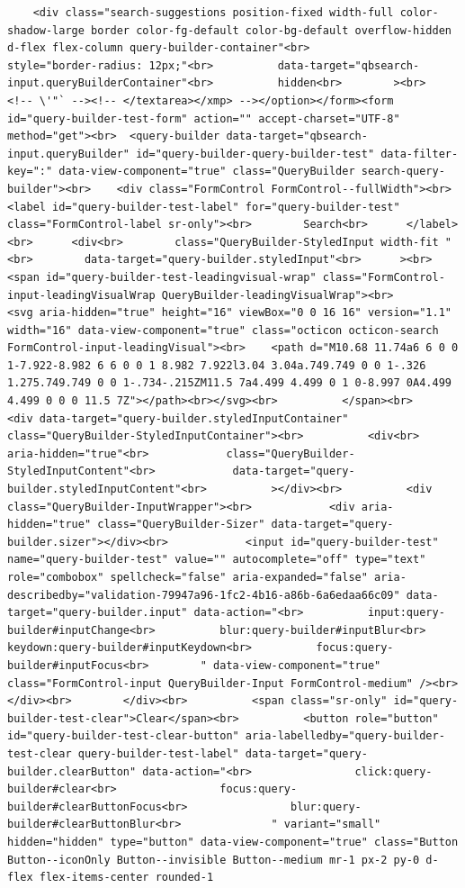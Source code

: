 \documentclass[
  letterpaper,
]{book}
\begin{document}
\begin{verbatim}
    <div class="search-suggestions position-fixed width-full color-shadow-large border color-fg-default color-bg-default overflow-hidden d-flex flex-column query-builder-container"<br>          style="border-radius: 12px;"<br>          data-target="qbsearch-input.queryBuilderContainer"<br>          hidden<br>        ><br>          <!-- \'"` --><!-- </textarea></xmp> --></option></form><form id="query-builder-test-form" action="" accept-charset="UTF-8" method="get"><br>  <query-builder data-target="qbsearch-input.queryBuilder" id="query-builder-query-builder-test" data-filter-key=":" data-view-component="true" class="QueryBuilder search-query-builder"><br>    <div class="FormControl FormControl--fullWidth"><br>      <label id="query-builder-test-label" for="query-builder-test" class="FormControl-label sr-only"><br>        Search<br>      </label><br>      <div<br>        class="QueryBuilder-StyledInput width-fit "<br>        data-target="query-builder.styledInput"<br>      ><br>          <span id="query-builder-test-leadingvisual-wrap" class="FormControl-input-leadingVisualWrap QueryBuilder-leadingVisualWrap"><br>            <svg aria-hidden="true" height="16" viewBox="0 0 16 16" version="1.1" width="16" data-view-component="true" class="octicon octicon-search FormControl-input-leadingVisual"><br>    <path d="M10.68 11.74a6 6 0 0 1-7.922-8.982 6 6 0 0 1 8.982 7.922l3.04 3.04a.749.749 0 0 1-.326 1.275.749.749 0 0 1-.734-.215ZM11.5 7a4.499 4.499 0 1 0-8.997 0A4.499 4.499 0 0 0 11.5 7Z"></path><br></svg><br>          </span><br>        <div data-target="query-builder.styledInputContainer" class="QueryBuilder-StyledInputContainer"><br>          <div<br>            aria-hidden="true"<br>            class="QueryBuilder-StyledInputContent"<br>            data-target="query-builder.styledInputContent"<br>          ></div><br>          <div class="QueryBuilder-InputWrapper"><br>            <div aria-hidden="true" class="QueryBuilder-Sizer" data-target="query-builder.sizer"></div><br>            <input id="query-builder-test" name="query-builder-test" value="" autocomplete="off" type="text" role="combobox" spellcheck="false" aria-expanded="false" aria-describedby="validation-79947a96-1fc2-4b16-a86b-6a6edaa66c09" data-target="query-builder.input" data-action="<br>          input:query-builder#inputChange<br>          blur:query-builder#inputBlur<br>          keydown:query-builder#inputKeydown<br>          focus:query-builder#inputFocus<br>        " data-view-component="true" class="FormControl-input QueryBuilder-Input FormControl-medium" /><br>          </div><br>        </div><br>          <span class="sr-only" id="query-builder-test-clear">Clear</span><br>          <button role="button" id="query-builder-test-clear-button" aria-labelledby="query-builder-test-clear query-builder-test-label" data-target="query-builder.clearButton" data-action="<br>                click:query-builder#clear<br>                focus:query-builder#clearButtonFocus<br>                blur:query-builder#clearButtonBlur<br>              " variant="small" hidden="hidden" type="button" data-view-component="true" class="Button Button--iconOnly Button--invisible Button--medium mr-1 px-2 py-0 d-flex flex-items-center rounded-1 
\end{verbatim}
\end{document}
